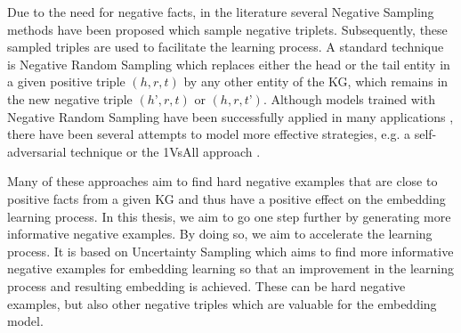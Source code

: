 Due to the need for negative facts, in the literature several Negative Sampling methods have been proposed which sample negative triplets.
Subsequently, these sampled triples are used to facilitate the learning process. 
A standard technique is Negative Random Sampling which replaces either the head or the tail entity in a given positive triple $(h, r, t)$ by any other entity of the \ac{KG}, which remains in the new negative triple $(h’,r,t)$ or $(h,r,t’)$. 
Although models trained with Negative Random Sampling have been successfully applied in many applications \cite{TransE}, there have been several attempts to model more effective strategies, e.g. 
a self-adversarial technique \cite{RotatE} or the 1VsAll approach \cite{ConvE}.

Many of these approaches aim to find hard negative examples that are close to positive facts from a given \ac{KG} and thus have a positive effect on the embedding learning process. 
In this thesis, we aim to go one step further by generating more informative negative examples. 
By doing so, we aim to accelerate the learning process.
It is based on Uncertainty Sampling which aims to
find more informative negative examples for embedding learning so that an improvement in the learning process and resulting embedding is achieved.
These can be hard negative examples, but also other negative triples which are valuable for the embedding model.

